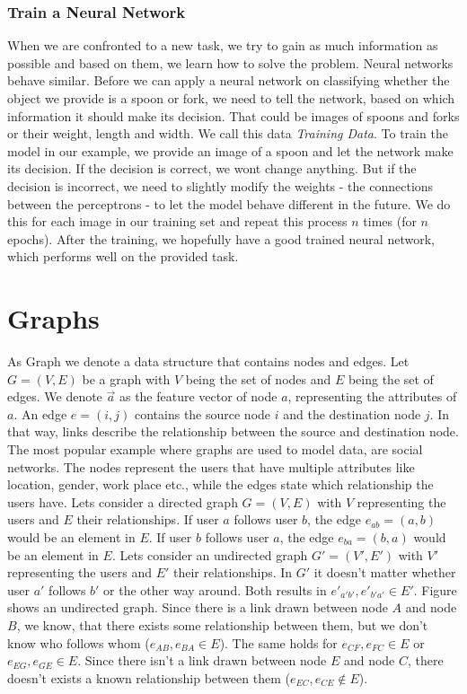    \subsubsection*{Train a Neural Network}

      When we are confronted to a new task, we try to gain as much information as possible and based on them, we learn how to solve the problem.
      Neural networks behave similar.
      Before we can apply a neural network on classifying whether the object we provide is a spoon or fork, we need to tell the network, based on which information it should make its decision.
      That could be images of spoons and forks or their weight, length and width.
      We call this data \emph{Training Data}.
      To train the model in our example, we provide an image of a spoon and let the network make its decision.
      If the decision is correct, we wont change anything.
      But if the decision is incorrect, we need to slightly modify the weights - the connections between the perceptrons - to let the model behave different in the future.
      We do this for each image in our training set and repeat this process $n$ times (for $n$ epochs).
      After the training, we hopefully have a good trained neural network, which performs well on the provided task.

	\section{Graphs}

		As Graph we denote a data structure that contains nodes and edges. 
    Let $G = (V, E)$ be a graph with $V$ being the set of nodes and $E$ being the set of edges.
    We denote $\overrightarrow{a}$ as the feature vector of node $a$, representing the attributes of $a$.
    An edge $e = (i,j)$ contains the source node $i$ and the destination node $j$.
    In that way, links describe the relationship between the source and destination node. 
    The most popular example where graphs are used to model data, are social networks. 
    The nodes represent the users that have multiple attributes like location, gender, work place etc., while the edges state which relationship the users have.
    Lets consider a directed graph $G = (V,E)$ with $V$ representing the users and $E$ their relationships.
    If user $a$ follows user $b$, the edge $e_{ab} = (a,b)$ would be an element in $E$.
    If user $b$ follows user $a$, the edge $e_{ba} = (b,a)$ would be an element in $E$.
    Lets consider an undirected graph $G' = (V',E')$ with $V'$ representing the users and $E'$ their relationships.
    In $G'$ it doesn't matter whether user $a'$ follows $b'$ or the other way around. 
    Both results in $e'_{a'b'}, e'_{b'a'} \in E'$.
    Figure  shows an undirected graph.
    Since there is a link drawn between node $A$ and node $B$, we know, that there exists some relationship between them, but we don't know who follows whom ($e_{AB}, e_{BA} \in E$).
    The same holds for $e_{CF}, e_{FC} \in E$ or $e_{EG}, e_{GE} \in E$.
    Since there isn't a link drawn between node $E$ and node $C$, there doesn't exists a known relationship between them ($e_{EC}, e_{CE} \not\in E$).


